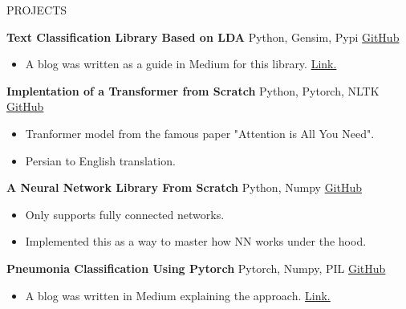 \documentclass{resume} %
\begin{document}
	\begin{rSection}{PROJECTS}
		\vspace{-0.5em}
		\item \textbf{Text Classification Library Based on LDA} {Python, Gensim, Pypi} \hfill \href{https://github.com/FeryET/lda_classification}{GitHub}
		\begin{itemize}
			\item A blog was written as a guide in Medium for this library. \href{https://medium.com/analytics-vidhya/text-classification-using-lda-35d5b98d4f05}{Link.}
		\end{itemize}
		
		
		\item \textbf{Implentation of a Transformer from Scratch} {Python, Pytorch, NLTK} \hfill \href{https://github.com/FeryET/persian-to-english-transformer}{GitHub}
		\begin{itemize}
			\item Tranformer model from the famous paper "Attention is All You Need".
			\item Persian to English translation.
		\end{itemize}
		
		
		\item \textbf{A Neural Network Library From Scratch} {Python, Numpy} \hfill \href{https://github.com/FeryET/scratch_nn_lib}{GitHub}
		\begin{itemize}
			\item Only supports fully connected networks.
			\item Implemented this as a way to master how NN works under the hood.
		\end{itemize}
		
		\item \textbf{Pneumonia Classification Using Pytorch} {Pytorch, Numpy, PIL} \hfill \href{https://github.com/FeryET/pneumonia_analysis}{GitHub}
		\begin{itemize}
			\item A blog was written in Medium explaining the approach.
			\href{https://medium.com/analytics-vidhya/a-cnn-to-classify-pneumonia-step-by-step-using-pytorch-13a90905abd7}{Link.}
		\end{itemize}
		
		
	\end{rSection} 
	
\end{document}
